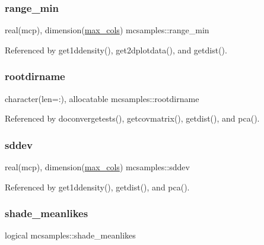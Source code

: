 \subsubsection{\texorpdfstring{range\+\_\+min}{range\_min}}
{\footnotesize\ttfamily real(mcp), dimension(\mbox{\hyperlink{namespacemcsamples_ae8386bad918d8af8d203683c01d5818c}{max\+\_\+cols}}) mcsamples\+::range\+\_\+min}



Referenced by get1ddensity(), get2dplotdata(), and getdist().

\mbox{\label{namespacemcsamples_a578b65f55aa7a0d9598291d1cbd550db}} 
\subsubsection{\texorpdfstring{rootdirname}{rootdirname}}
{\footnotesize\ttfamily character(len=\+:), allocatable mcsamples\+::rootdirname}



Referenced by doconvergetests(), getcovmatrix(), getdist(), and pca().

\mbox{\label{namespacemcsamples_aacce77bfdf0523e8c96285821ce2a3f4}} 
\subsubsection{\texorpdfstring{sddev}{sddev}}
{\footnotesize\ttfamily real(mcp), dimension(\mbox{\hyperlink{namespacemcsamples_ae8386bad918d8af8d203683c01d5818c}{max\+\_\+cols}}) mcsamples\+::sddev}



Referenced by get1ddensity(), getdist(), and pca().

\mbox{\label{namespacemcsamples_ad55967ca18b8319069920d6d1e772bb1}} 
\subsubsection{\texorpdfstring{shade\+\_\+meanlikes}{shade\_meanlikes}}
{\footnotesize\ttfamily logical mcsamples\+::shade\+\_\+meanlikes}



